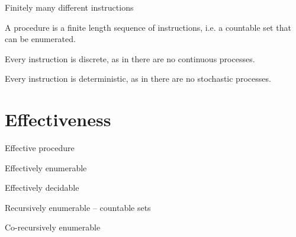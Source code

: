 Finitely many different instructions

A procedure is a finite length sequence of instructions, i.e. a countable set
that can be enumerated.

Every instruction is discrete, as in there are no continuous processes.

Every instruction is deterministic, as in there are no stochastic processes.

\section{Effectiveness}

Effective procedure

Effectively enumerable

Effectively decidable

Recursively enumerable -- countable sets

Co-recursively enumerable


